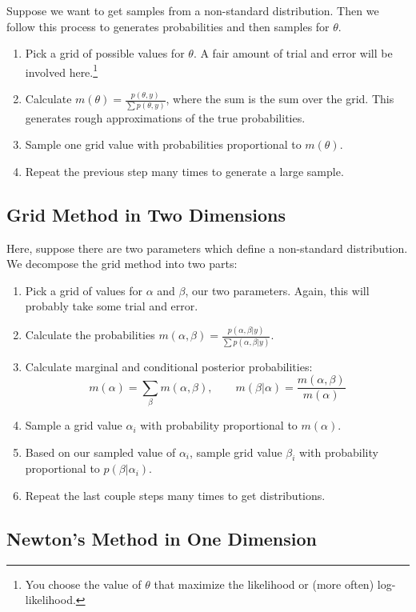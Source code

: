 \documentclass[12pt]{article}
\begin{document}
Suppose we want to get samples from a non-standard distribution. Then
we follow this process to generates probabilities and then samples for 
$\theta$. 
\begin{enumerate}
   \item Pick a grid of possible values for $\theta$. A fair amount
      of trial and error will be involved here.\footnote{You choose
      the value of $\theta$ that maximize the likelihood or
      (more often) log-likelihood.}
   \item Calculate $m(\theta) = \frac{p(\theta, y)}{\sum p(\theta, y)}$,
      where the sum is the sum over the grid. This generates rough
      approximations of the true probabilities.
   \item Sample one grid value with probabilities proportional to 
      $m(\theta)$.
   \item Repeat the previous step many times to generate a large sample.
\end{enumerate}

\subsection{Grid Method in Two Dimensions} 

Here, suppose there are two parameters which define a non-standard
distribution. We decompose the grid method into two parts:
\begin{enumerate}
   \item Pick a grid of values for $\alpha$ and $\beta$, our two 
      parameters. Again, this will probably take some trial and 
      error.
   \item Calculate the probabilities $m(\alpha, \beta) = \frac{ 
      p(\alpha, \beta |y)}{\sum p(\alpha, \beta | y)}$.
   \item Calculate marginal and conditional posterior probabilities:
      \[ m(\alpha) = \sum_\beta m(\alpha, \beta), \qquad 
	 m(\beta|\alpha) = \frac{m(\alpha, \beta)}{m(\alpha)}\]
   \item Sample a grid value $\alpha_i$ with probability proportional
      to $m(\alpha)$. 
   \item Based on our sampled value of $\alpha_i$, sample grid value
      $\beta_i$ with probability proportional to $p(\beta | \alpha_i)$.
   \item Repeat the last couple steps many times to get distributions.
\end{enumerate}

\subsection{Newton's Method in One Dimension}
\end{document}
